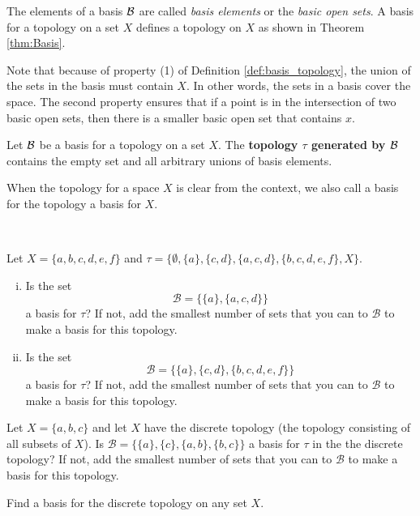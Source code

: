  The elements of a basis $\mathcal{B}$ are called \emph{basis elements} or the \emph{basic open sets}. A basis for a topology on a set $X$ defines a topology on $X$ as shown in Theorem \ref{thm:Basis}.
 
 Note that because of property (1) of Definition \ref{def:basis_topology}, the union of the sets in the basis must contain $X$. In other words, the sets in a basis cover the space. The second property ensures that if a point is in the intersection of two basic open sets, then there is a smaller basic open set that contains $x$. 

\begin{definition} Let $\mathcal{B}$ be a basis for a topology on a set $X$. The \textbf{topology $\tau$ generated by $\mathcal{B}$} contains the empty set and all arbitrary unions of basis elements.
\end{definition}

When the topology for a space $X$ is clear from the context, we also call a basis for the topology a basis for $X$. 

\begin{activity} ~
\ba
\item Let $X=\{a,b,c,d,e,f\}$ and $\tau= \{\emptyset, \{a\}, \{c,d\},\{a,c,d\}, \{b,c,d,e,f\}, X \}$. 
	\begin{enumerate}[i.]
	\item Is the set 
	\[\mathcal{B}  = \{\{a\},\{a,c,d\} \}\] 
a basis for $\tau$? If not, add the smallest number of sets that you can to $\mathcal{B}$ to make a basis for this topology.

	\item Is the set 
\[\mathcal{B}  = \{\{a\},\{c,d\},\{b,c,d,e,f\} \}\] 
a basis for $\tau$? If not, add the smallest number of sets that you can to $\mathcal{B}$ to make a basis for this topology.

	\end{enumerate}

\item Let $X=\{a,b,c\}$ and let $X$ have the discrete topology (the topology consisting of all subsets of $X$). Is $\mathcal{B}  = \{\{a\},\{c\},\{a,b\},\{b,c\} \}$ a basis for $\tau$ in the the discrete topology? If not, add the smallest number of sets that you can to $\mathcal{B}$ to make a basis for this topology.

\item Find a basis for the discrete topology on any set $X$.

\ea

\end{activity}

